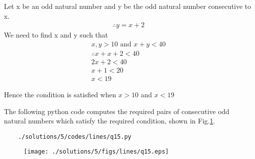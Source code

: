 	
Let x be an odd natural number and y be the odd natural number consecutive to x.
	\begin{align}
	\therefore y=x+2
	\end{align}
	We need to find x and y  such that 
	\begin{multline}
x,y >10 \text{ and } x+y<40\\
\therefore x+x+2<40\\
2x+2<40\\
x+1<20\\
x<19
	\end{multline}
	
	
	Hence the condition is satisfied when $x>10$ and $x<19$
	
	
	
	The following python code computes the required pairs of consecutive odd natural numbers which satisfy the required condition, shown in Fig.\ref{fig:3.11.5_fifteen}.
	\begin{lstlisting}
	./solutions/5/codes/lines/q15.py
	\end{lstlisting}
	\begin{figure}[!ht]
	\centering
	\texttt{[image: ./solutions/5/figs/lines/q15.eps]}
	\caption{}
	\label{fig:3.11.5_fifteen}	
	\end{figure}

